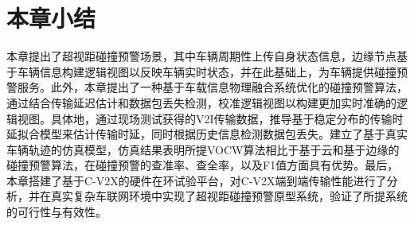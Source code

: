\section{本章小结}\label{section 5-6}

本章提出了超视距碰撞预警场景，其中车辆周期性上传自身状态信息，边缘节点基于车辆信息构建逻辑视图以反映车辆实时状态，并在此基础上，为车辆提供碰撞预警服务。此外，本章提出了一种基于车载信息物理融合系统优化的碰撞预警算法，通过结合传输延迟估计和数据包丢失检测，校准逻辑视图以构建更加实时准确的逻辑视图。具体地，通过现场测试获得的V2I传输数据，推导基于稳定分布的传输时延拟合模型来估计传输时延，同时根据历史信息检测数据包丢失。建立了基于真实车辆轨迹的仿真模型，仿真结果表明所提VOCW算法相比于基于云和基于边缘的碰撞预警算法，在碰撞预警的查准率、查全率，以及F1值方面具有优势。最后，本章搭建了基于C-V2X的硬件在环试验平台，对C-V2X端到端传输性能进行了分析，并在真实复杂车联网环境中实现了超视距碰撞预警原型系统，验证了所提系统的可行性与有效性。
